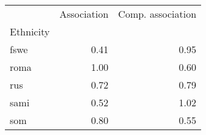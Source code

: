 \begin{tabular}{lrr}
\toprule
{} &  Association &  Comp. association \\
Ethnicity &              &                    \\
\midrule
fswe      &         0.41 &               0.95 \\
roma      &         1.00 &               0.60 \\
rus       &         0.72 &               0.79 \\
sami      &         0.52 &               1.02 \\
som       &         0.80 &               0.55 \\
\bottomrule
\end{tabular}
